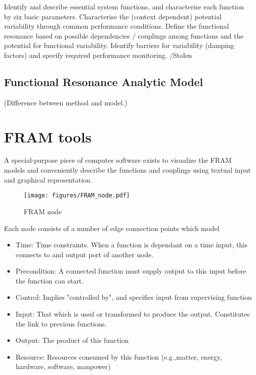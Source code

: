 Identify and describe essential system functions, and characterise each function by six basic parameters.
Characterise the (context dependent) potential variability through common performance conditions.
Define the functional resonance based on possible dependencies / couplings among functions and the potential for functional variability.
Identify barriers for variability (damping factors) and specify required performance monitoring.
/Stolen
\subsection{Functional Resonance Analytic Model}

(Difference between method and model.)


\section{FRAM tools}
A special-purpose piece of computer software exists to visualize the FRAM models and conveniently describe the functions and couplings using textual input and graphical representation.

\begin{figure}[h]
 \centering
   \texttt{[image: figures/FRAM\_node.pdf]}
 \caption{FRAM node}
 \label{fig:logbog}
\end{figure}


Each node consists of a number of edge connection points  which model

\begin{itemize}
  \item Time: Time constraints. When a function is dependant on a time input, this connects to and output port of another node.

  \item Precondition: A connected function must supply output to this input before the function can start.

  \item Control: Implies "controlled by", and specifies input from supervising function
  
  \item Input: That which is used or transformed to produce the output. Constitutes the link to previous functions.

  \item Output: The product of this function
  \item Resource: Resources consumed by this function (e.g.,matter, energy, hardware, software, manpower)
\end{itemize} 


